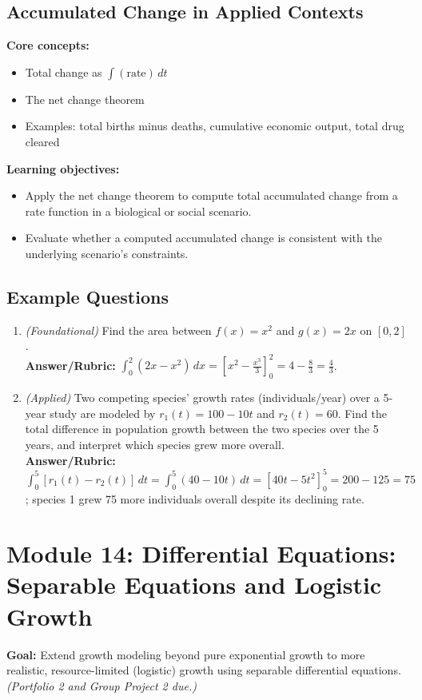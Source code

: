 \documentclass{article}
\begin{document}
\subsection{Accumulated Change in Applied Contexts}
\textbf{Core concepts:}
\begin{itemize}[leftmargin=*]
  \item Total change as $\int(\text{rate})\,dt$
  \item The net change theorem
  \item Examples: total births minus deaths, cumulative economic output, total drug cleared
\end{itemize}
\textbf{Learning objectives:}
\begin{itemize}[leftmargin=*]
  \item Apply the net change theorem to compute total accumulated change from a rate function in a biological or social scenario.
  \item Evaluate whether a computed accumulated change is consistent with the underlying scenario's constraints.
\end{itemize}

\subsection*{Example Questions}
\begin{enumerate}[leftmargin=*]
  \item \textit{(Foundational)} Find the area between $f(x)=x^2$ and $g(x)=2x$ on $[0,2]$. \\
  \textbf{Answer/Rubric:} $\int_0^2 (2x-x^2)\,dx = \left[x^2-\tfrac{x^3}{3}\right]_0^2 = 4-\tfrac{8}{3}=\tfrac{4}{3}$.
  \item \textit{(Applied)} Two competing species' growth rates (individuals/year) over a 5-year study are modeled by $r_1(t)=100-10t$ and $r_2(t)=60$. Find the total difference in population growth between the two species over the 5 years, and interpret which species grew more overall. \\
  \textbf{Answer/Rubric:} $\int_0^5 [r_1(t)-r_2(t)]\,dt = \int_0^5 (40-10t)\,dt = [40t-5t^2]_0^5 = 200-125=75$; species 1 grew 75 more individuals overall despite its declining rate.
\end{enumerate}


\section{Module 14: Differential Equations: Separable Equations and Logistic Growth}
\textbf{Goal:} Extend growth modeling beyond pure exponential growth to more realistic, resource-limited (logistic) growth using separable differential equations. \textit{(Portfolio 2 and Group Project 2 due.)}
\end{document}
